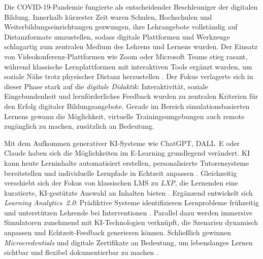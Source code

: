 Die COVID-19-Pandemie fungierte als entscheidender Beschleuniger der digitalen Bildung. Innerhalb kürzester Zeit waren Schulen, Hochschulen und Weiterbildungseinrichtungen gezwungen, ihre Lehrangebote vollständig auf Distanzformate umzustellen, sodass digitale Plattformen und Werkzeuge schlagartig zum zentralen Medium des Lehrens und Lernens wurden. Der Einsatz von Videokonferenz-Plattformen wie Zoom oder Microsoft Teams stieg rasant, während klassische Lernplattformen mit interaktiven Tools ergänzt wurden, um soziale Nähe trotz physischer Distanz herzustellen \parencite[S.~1f]{hodges_torrey_2020}. Der Fokus verlagerte sich in dieser Phase stark auf die \textit{digitale Didaktik}: Interaktivität, soziale Eingebundenheit und lernförderliches Feedback wurden zu zentralen Kriterien für den Erfolg digitaler Bildungsangebote. Gerade im Bereich simulationsbasierten Lernens gewann die Möglichkeit, virtuelle Trainingsumgebungen auch remote zugänglich zu machen, zusätzlich an Bedeutung.

Mit dem Aufkommen generativer KI-Systeme wie ChatGPT, DALL~E oder Claude haben sich die Möglichkeiten im E-Learning grundlegend verändert. KI kann heute Lerninhalte automatisiert erstellen, personalisierte Tutorensysteme bereitstellen und individuelle Lernpfade in Echtzeit anpassen \parencite[S.~43]{zhai_chatgpt_2023}. Gleichzeitig verschiebt sich der Fokus von klassischen LMS zu \textit{\ac{LXP}}, die Lernenden eine kuratierte, KI-gestützte Auswahl an Inhalten bieten \parencite[S.~1]{cockrill_learning_2021}. Ergänzend entwickelt sich \textit{Learning Analytics~2.0}: Prädiktive Systeme identifizieren Lernprobleme frühzeitig und unterstützen Lehrende bei Interventionen \parencite[S.~1979f]{ifenthaler_utilising_2020}. Parallel dazu werden immersive Simulatoren zunehmend mit KI-Technologien verknüpft, die Szenarien dynamisch anpassen und Echtzeit-Feedback generieren können. Schließlich gewinnen \textit{Microcredentials} und digitale Zertifikate an Bedeutung, um lebenslanges Lernen sichtbar und flexibel dokumentierbar zu machen \parencite[S.~1]{gish-lieberman_micro-credentials_2021}.

